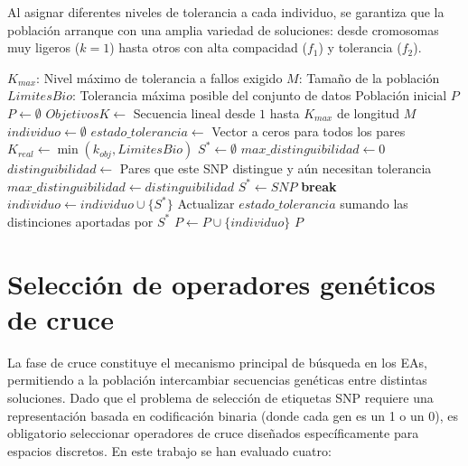 Al asignar diferentes niveles de tolerancia a cada individuo, se garantiza que la población arranque con una amplia variedad de soluciones: desde cromosomas muy ligeros ($k=1$) hasta otros con alta compacidad ($f_1$) y tolerancia ($f_2$).

\begin{algorithm}[H]
\caption{Inicialización dinámica de multitolerancia (\textit{greedy\_multi})}
\begin{algorithmic}[1]
\Require $K_{max}$: Nivel máximo de tolerancia a fallos exigido
\Require $M$: Tamaño de la población
\Require $LimitesBio$: Tolerancia máxima posible del conjunto de datos
\Ensure Población inicial $P$
\State $P \gets \emptyset$ 
\State $ObjetivosK \gets$ Secuencia lineal desde $1$ hasta $K_{max}$ de longitud $M$
    \State $individuo \gets \emptyset$
    \State $estado\_tolerancia \gets$ Vector a ceros para todos los pares
    \State $K_{real} \gets \min(k_{obj}, LimitesBio)$
     
        \State $S^* \gets \emptyset$ 
        \State $max\_distinguibilidad \gets 0$ 
            \State $distinguibilidad \gets$ Pares que este SNP distingue y aún necesitan tolerancia
                \State $max\_distinguibilidad \gets distinguibilidad$
                \State $S^* \gets SNP$
            \EndIf
        \EndFor
         \textbf{break} \EndIf
        \State $individuo \gets individuo \cup \{S^*\}$
        \State Actualizar $estado\_tolerancia$ sumando las distinciones aportadas por $S^*$ 
    \EndWhile
    \State $P \gets P \cup \{individuo\}$
\EndFor
\State \Return $P$
\end{algorithmic}
\end{algorithm}

\section{Selección de operadores genéticos de cruce}

La fase de cruce constituye el mecanismo principal de búsqueda en los EAs, permitiendo a la población intercambiar secuencias genéticas entre distintas soluciones. Dado que el problema de selección de etiquetas SNP requiere una representación basada en codificación binaria (donde cada gen es un 1 o un 0), es obligatorio seleccionar operadores de cruce diseñados específicamente para espacios discretos. En este trabajo se han evaluado cuatro:

